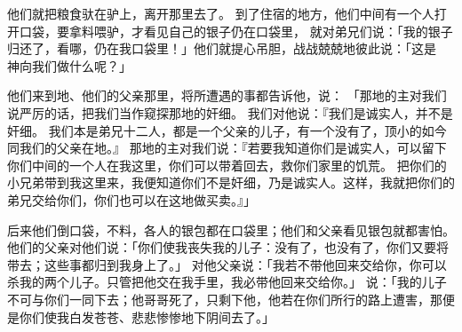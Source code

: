 {他们就把粮食驮在驴上，离开那里去了。
到了住宿的地方，他们中间有一个人打开口袋，要拿料喂驴，才看见自己的银子仍在口袋里，
就对弟兄们说：「我的银子归还了，看哪，仍在我口袋里！」他们就提心吊胆，战战兢兢地彼此说：「这是　神向我们做什么呢？」
\par }{\PP {}他们来到{}地、他们的父亲{}那里，将所遭遇的事都告诉他，说：
「那地的主对我们说严厉的话，把我们当作窥探那地的奸细。
我们对他说：『我们是诚实人，并不是奸细。
我们本是弟兄十二人，都是一个父亲的儿子，有一个没有了，顶小的如今同我们的父亲在{}地。』
那地的主对我们说：『若要我知道你们是诚实人，可以留下你们中间的一个人在我这里，你们可以带着{}回去，救你们家里的饥荒。
把你们的小兄弟带到我这里来，我便知道你们不是奸细，乃是诚实人。这样，我就把你们的弟兄交给你们，你们也可以在这地做买卖。』」
\par }{\PP {}后来他们倒口袋，不料，各人的银包都在口袋里；他们和父亲看见银包就都害怕。
他们的父亲{}对他们说：「你们使我丧失我的儿子：{}没有了，{}也没有了，你们又要将{}带去；这些事都归到我身上了。」
对他父亲说：「我若不带他回来交给你，你可以杀我的两个儿子。只管把他交在我手里，我必带他回来交给你。」
说：「我的儿子不可与你们一同下去；他哥哥死了，只剩下他，他若在你们所行的路上遭害，那便是你们使我白发苍苍、悲悲惨惨地下阴间去了。」

}

